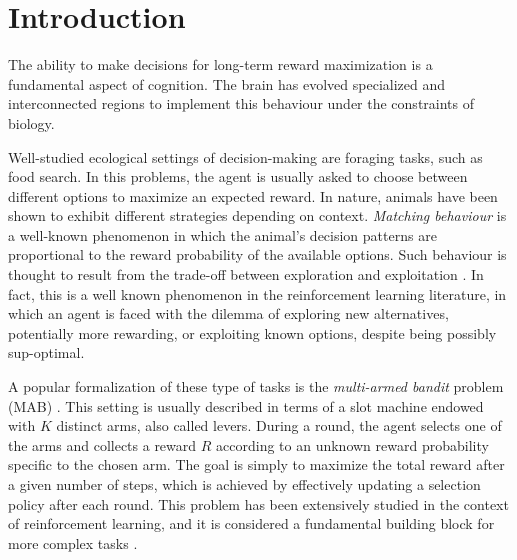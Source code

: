 
\section{Introduction}

The ability to make decisions for long-term reward maximization is a fundamental aspect of cognition. The brain has evolved specialized and interconnected regions to implement this behaviour under the constraints of biology.

Well-studied ecological settings of decision-making are foraging tasks, such as food search. In this problems, the agent is usually asked to choose between different options to maximize an expected reward.
In nature, animals have been shown to exhibit different strategies depending on context.
\textit{Matching behaviour} is a well-known phenomenon in which the animal's decision patterns are proportional to the reward probability of the available options.
Such behaviour is thought to result from the trade-off between exploration and exploitation \cite{suttonReinforcementLearningProblem1998, nivEvolutionReinforcementLearning2002}.
In fact, this is a well known phenomenon in the reinforcement learning literature, in which an agent is faced with the dilemma of exploring new alternatives, potentially more rewarding, or exploiting known options, despite being possibly sup-optimal.

A popular formalization of these type of tasks is the \textit{multi-armed bandit} problem (MAB) \cite{averbeckTheoryChoiceBandit2015}. This setting is usually described in terms of a slot machine endowed with $K$ distinct arms, also called levers.
During a round, the agent selects one of the arms and collects a reward $R$ according to an unknown reward probability specific to the chosen arm.
The goal is simply to maximize the total reward after a given number of steps, which is achieved by effectively updating a selection policy after each round.
This problem has been extensively studied in the context of reinforcement learning, and it is considered a fundamental building block for more complex tasks \cite{suttonReinforcementLearningProblem1998}.

